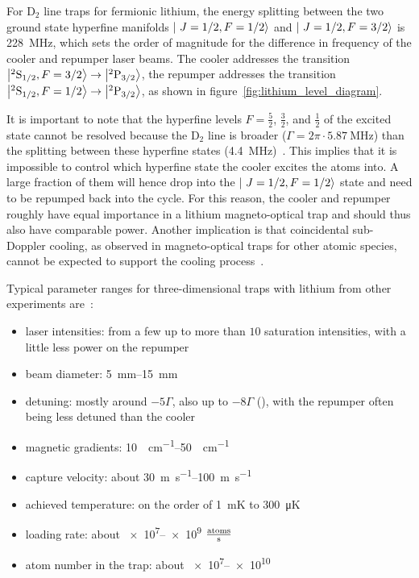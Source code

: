 For D$_2$ line traps for fermionic lithium, the energy splitting between the two ground state hyperfine manifolds $\Ket{~J=1/2, F=1/2}$ and $\Ket{~J=1/2, F=3/2}$ is \SI{228}{\mega\hertz}, which sets the order of magnitude for the difference in frequency of the cooler and repumper laser beams. The cooler addresses the transition $\Ket{^2\text{S}_{1/2}, F = 3/2} \rightarrow \Ket{^2\text{P}_{3/2}}$, the repumper addresses the transition $\Ket{^2\text{S}_{1/2}, F = 1/2} \rightarrow \Ket{^2\text{P}_{3/2}}$, as shown in figure~\ref{fig:lithium_level_diagram}.

It is important to note that the hyperfine levels $F = \frac{5}{2}$, $\frac{3}{2}$, and $\frac{1}{2}$ of the excited state cannot be resolved because the D$_2$ line is broader ($\Gamma = 2\pi \cdot \SI[]{5.87}{\mega\hertz}$) than the splitting between these hyperfine states (\SI[]{4.4}{\mega\hertz})~\cite{gehm_properties_2003}. This implies that it is impossible to control which hyperfine state the cooler excites the atoms into. A large fraction of them will hence drop into the $\Ket{~J=1/2, F=1/2}$ state and need to be repumped back into the cycle. For this reason, the cooler and repumper roughly have equal importance in a lithium magneto-optical trap and should thus also have comparable power. Another implication is that coincidental sub-Doppler cooling, as observed in magneto-optical traps for other atomic species, cannot be expected to support the cooling process~\cite{grier_lambda-enhanced_2013}.

Typical parameter ranges for three-dimensional traps with lithium from other experiments are~\cite{
    tiecke_high-flux_2009,
    kawanaka_decay_1993,
    schunemann_magneto-optic_1998,
    mewes_simultaneous_1999,
    hilker_laser_2012,
    kerkmann_novel_2019,
    ladouceur_compact_2009,
    chen_lithium-cesium_2021,    
    burchianti_efficient_2014,
    li_enhanced_2015,
}:
\begin{itemize}
    \item laser intensities: from a few up to more than $10$ saturation intensities, with a little less power on the repumper
    \item beam diameter: \SIrange{5}{15}{\milli\meter}
    \item detuning: mostly around $-5\Gamma$, also up to $-8 \Gamma$ (\cite{li_enhanced_2015}), with the repumper often being less detuned than the cooler
    \item magnetic gradients: \SIrange{10}{50}{\gauss\per\centi\meter}
    \item capture velocity: about \SIrange[]{30}{100}{\meter\per\second} 
    \item achieved temperature: on the order of \SI[]{1}{\milli\kelvin} to \SI[]{300}{\micro\kelvin}
    \item loading rate: about \SIrange[]{e7}{e9}{} $\frac{\text{atoms}}{\si[]{\second}}$
    \item atom number in the trap: about \SIrange{e7}{e10}{}
\end{itemize}

